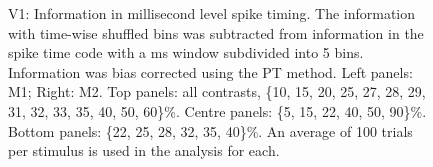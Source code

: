 \begin{figure}[htbp]
\begin{subfigure}[b]{0.5\linewidth}
    \end{subfigure}
    \caption{V1: Information in millisecond level spike timing.
The information with time-wise shuffled bins was subtracted from information in the spike time code with a \unit[20]{ms} window subdivided into 5 bins.
Information was bias corrected using the PT method.
Left panels: M1; Right: M2.
Top panels: all contrasts, \{10, 15, 20, 25, 27, 28, 29, 31, 32, 33, 35, 40, 50, 60\}\%.
Centre panels: \{5, 15, 22, 40, 50, 90\}\%.
Bottom panels: \{22, 25, 28, 32, 35, 40\}\%.
An average of 100 trials per stimulus is used in the analysis for each.
}
    \label{fig:v1-dif}
\end{figure}


% 

